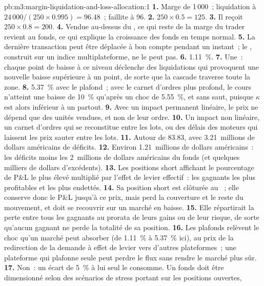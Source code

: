 \begin{solution}{pb:m3:margin-liquidation-and-loss-allocation:1}
\textbf{1.} Marge de 1\,000~; liquidation à $24\,000/(250 \times 0.995) = 96.48$~; faillite à 96. \textbf{2.} $250
\times 0.5 = 125$. \textbf{3.} Il reçoit $250 \times 0.8 = 200$. \textbf{4.} Vendue au-dessus du , ce qui reste
de la marge du trader revient au fonds, ce qui explique la croissance des fonds en temps normal. \textbf{5.} La dernière transaction peut être déplacée
à bon compte pendant un instant~; le , construit sur un indice multiplateforme, ne le peut pas. \textbf{6.} 1.11~\%. \textbf{7.} Une~: chaque point de
baisse à ce niveau déclenche des liquidations qui provoquent une nouvelle baisse supérieure à un point, de sorte que la cascade traverse toute la zone.
\textbf{8.} 5.37~\% avec le plafond~; avec le carnet d'ordres plus profond, le cours n'atteint une baisse de 10~\% qu'après un choc de 5.55~\%, et sans saut, puisque $\kappa$ est alors inférieur à un partout. \textbf{9.} Avec un impact permanent linéaire, le prix ne dépend que des unités vendues, et non
de leur ordre. \textbf{10.} Un impact non linéaire, un carnet d'ordres qui se reconstitue entre les lots, ou des délais des moteurs qui laissent les prix sauter
entre les lots. \textbf{11.} Autour de 83.83, avec 3.21~millions de dollars américains de déficits. \textbf{12.} Environ 1.21~millions de dollars américains~: les
déficits moins les 2~millions de dollars américains du fonds (et quelques milliers de dollars d'excédents). \textbf{13.} Les positions short affichant le pourcentage de
P\&L le plus élevé multiplié par l'effet de levier effectif~: les gagnants les plus profitables et les plus endettés. \textbf{14.} Sa position short est clôturée au
~; elle conserve donc le P\&L jusqu'à ce prix, mais perd la couverture et le reste du mouvement, et doit se recouvrir
sur un marché en baisse. \textbf{15.} Elle répartirait la perte entre tous les gagnants au prorata de leurs gains ou de leur risque, de sorte
qu'aucun gagnant ne perde la totalité de sa position. \textbf{16.} Les plafonds relèvent le choc qu'un marché peut absorber (de 1.11~\% à 5.37~\% ici), au
prix de la redirection de la demande à effet de levier vers d'autres plateformes~; une plateforme qui plafonne seule peut perdre le flux sans rendre le
marché plus sûr. \textbf{17.} Non~: un écart de 5~\% à lui seul le consomme. Un fonds doit être dimensionné selon des scénarios de stress portant sur les positions ouvertes,

\end{solution}
